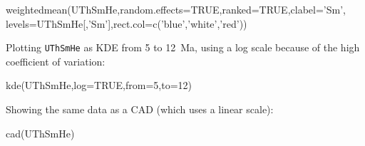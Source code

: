 \begin{refsection}
\begin{enumerate}
\begin{script}
weightedmean(UThSmHe,random.effects=TRUE,ranked=TRUE,clabel='Sm',
             levels=UThSmHe[,'Sm'],rect.col=c('blue','white','red'))
\end{script}

Plotting \texttt{UThSmHe} as KDE from 5 to 12~Ma, using a log scale
because of the high coefficient of variation:

\begin{console}
kde(UThSmHe,log=TRUE,from=5,to=12)
\end{console}

Showing the same data as a CAD (which uses a linear scale):

\begin{console}
cad(UThSmHe)
\end{console}

\end{enumerate}

\printbibliography[heading=subbibliography]

\end{refsection}
